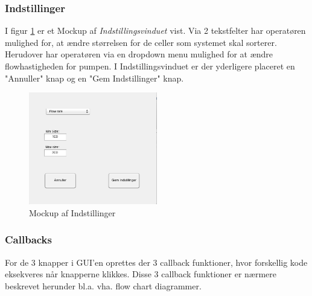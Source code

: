 \subsubsection{Indstillinger}
I figur \ref{fig:gui_settings} er et Mockup af \textit{Indstillingsvinduet} vist. Via 2 tekstfelter har operatøren mulighed for, at ændre størrelsen for de celler som systemet skal sorterer. Herudover har operatøren via en dropdown menu mulighed for at ændre flowhastigheden for pumpen. I Indstillingsvinduet er der yderligere placeret en "Annuller" knap og en "Gem Indstillinger" knap.
\begin{figure}[H]
	\centering
	\includegraphics[width=0.5\textwidth]{billeder/GUI_settings.png}
	\caption{Mockup af Indstillinger}
	\label{fig:gui_settings}
\end{figure}


\newpage
\subsubsection{Callbacks}
For de 3 knapper i GUI'en oprettes der 3 callback funktioner, hvor forskellig kode eksekveres når knapperne klikkes. Disse 3 callback funktioner er nærmere beskrevet herunder bl.a. vha. flow chart diagrammer.
